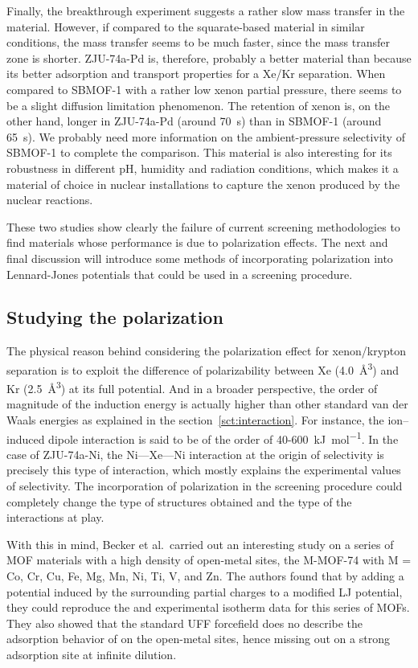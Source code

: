 \documentclass[main]{subfiles}
\begin{document}
Finally, the breakthrough experiment suggests a rather slow mass transfer in the material. However, if compared to the squarate-based material in similar conditions, the mass transfer seems to be much faster, since the mass transfer zone is shorter. ZJU-74a-Pd is, therefore, probably a better material than  because its better adsorption and transport properties for a Xe/Kr separation. When compared to SBMOF-1 with a rather low xenon partial pressure, there seems to be a slight diffusion limitation phenomenon. The retention of xenon is, on the other hand, longer in ZJU-74a-Pd (around \SI{70}{\s}) than in SBMOF-1 (around \SI{65}{\s}). We probably need more information on the ambient-pressure selectivity of SBMOF-1 to complete the comparison.
This material is also interesting for its robustness in different pH, humidity and radiation conditions, which makes it a material of choice in nuclear installations to capture the xenon produced by the nuclear reactions.

These two studies show clearly the failure of current screening methodologies to find materials whose performance is due to polarization effects. The next and final discussion will introduce some methods of incorporating polarization into Lennard-Jones potentials that could be used in a screening procedure.

\subsection{Studying the polarization}

The physical reason behind considering the polarization effect for xenon/krypton separation is to exploit the difference of polarizability between Xe (\SI{4.0}{\cubic\angstrom}) and Kr (\SI{2.5}{\cubic\angstrom})\autocite{Olney1997} at its full potential. And in a broader perspective, the order of magnitude of the induction energy is actually higher than other standard van der Waals energies as explained in the section~\ref{sct:interaction}. For instance, the ion--induced dipole interaction is said to be of the order of 40-600~\si{\kJ\per\mol}. In the case of ZJU-74a-Ni, the Ni---Xe---Ni interaction at the origin of selectivity is precisely this type of interaction, which mostly explains the experimental values of selectivity. The incorporation of polarization in the screening procedure could completely change the type of structures obtained and the type of the interactions at play.

With this in mind, Becker et al.\ carried out an interesting study on a series of MOF materials with a high density of open-metal sites, the M-MOF-74 with M = Co, Cr, Cu, Fe, Mg, Mn, Ni, Ti, V, and Zn.\autocite{Becker_2017} The authors found that by adding a potential induced by the surrounding partial charges to a modified LJ potential, they could reproduce the  and  experimental isotherm data for this series of MOFs. They also showed that the standard UFF forcefield does no describe the adsorption behavior of  on the open-metal sites, hence missing out on a strong adsorption site at infinite dilution. 
\end{document}
